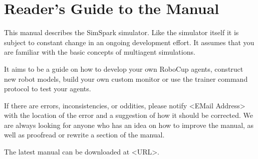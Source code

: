 \section{Reader's Guide to the Manual}


This manual describes the SimSpark simulator. Like the simulator
itself it is subject to constant change in an ongoing development
effort. It assumes that you are familiar with the basic concepts of
multiagent simulations.

It aims to be a guide on how to develop your own RoboCup agents,
construct new robot models, build your own custom monitor or use the
trainer command protocol to test your agents.

If there are errors, inconsistencies, or oddities, please notify
<EMail Address> with the location of the error and a suggestion of how
it should be corrected. We are always looking for anyone who has an
idea on how to improve the manual, as well as proofread or rewrite a
section of the manual.

The latest manual can be downloaded at <URL>.

